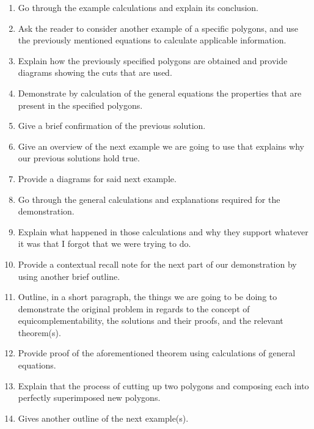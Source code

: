 \documentclass{article}
\begin{document}
\begin{enumerate}
    \item Go through the example calculations and explain its conclusion.
    
    \item Ask the reader to consider another example of a specific polygons, and use the previously mentioned equations to calculate applicable information.
    
    \item Explain how the previously specified polygons are obtained and provide diagrams showing the cuts that are used.
    
    \item Demonstrate by calculation of the general equations the properties that are present in the specified polygons.
    
    \item Give a brief confirmation of the previous solution.
    
    \item Give an overview of the next example we are going to use that explains why our previous solutions hold true.
    
    \item Provide a diagrams for said next example.
    
    \item Go through the general calculations and explanations required for the demonstration.
    
    \item Explain what happened in those calculations and why they support whatever it was that I forgot that we were trying to do.
    
    \item Provide a contextual recall note for the next part of our demonstration by using another brief outline.
    
    \item Outline, in a short paragraph, the things we are going to be doing to demonstrate the original problem in regards to the concept of equicomplementability, the solutions and their proofs, and the relevant theorem(s).
    
    \item Provide proof of the aforementioned theorem using calculations of general equations.
    
    \item Explain that the process of cutting up two polygons and composing each into perfectly superimposed new polygons.
    
    \item Gives another outline of the next example(s).
    

\end{enumerate}
\end{document}

